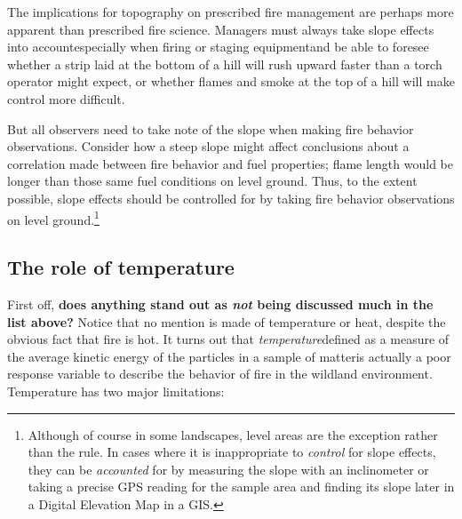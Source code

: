 The implications for topography on prescribed fire management are perhaps more apparent than prescribed fire science. 
Managers must always take slope effects into account\textemdash especially when firing or staging equipment\textemdash and be able to foresee whether a strip laid at the bottom of a hill will rush upward faster than a torch operator might expect, or whether flames and smoke at the top of a hill will make control more difficult.

But all observers need to take note of the slope when making fire behavior observations. 
Consider how a steep slope might affect conclusions about a correlation made between fire behavior and fuel properties; flame length would be longer than those same fuel conditions on level ground. 
Thus, to the extent possible, slope effects should be controlled for by taking fire behavior observations on level ground.\footnote{ 
Although of course in some landscapes, level areas are the exception rather than the rule. In cases where it is inappropriate to \emph{control} for slope effects, they can be \emph{accounted} for by measuring the slope with an inclinometer or taking a precise GPS reading for the sample area and finding its slope later in a Digital Elevation Map in a GIS.}

\subsection{The role of temperature} 

First off, \textbf{does anything stand out as \emph{not} being discussed much in the list above?} 
Notice that no mention is made of temperature or heat, despite the obvious fact that fire is hot. 
It turns out that \emph{temperature}\textemdash defined as a measure of the average kinetic energy of the particles in a sample of matter\textemdash is actually a poor response variable to describe the behavior of fire in the wildland environment. 
Temperature has two major limitations: 
 
